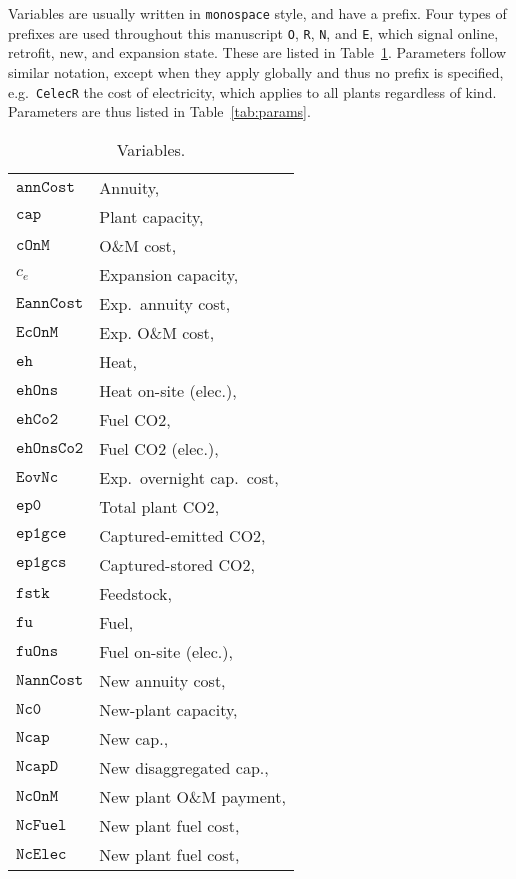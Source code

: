 \documentclass{amsart}
\begin{document}
Variables are usually written in \texttt{monospace} style, and have a prefix.
Four types of prefixes are used throughout this manuscript \texttt{O},
\texttt{R}, \texttt{N}, and \texttt{E}, which signal online, retrofit, new, and
expansion state. These are listed in Table~\ref{tab:vars}. Parameters follow
similar notation, except when they apply globally and thus no prefix is
specified, e.g.\ \texttt{CelecR} the cost of electricity, which applies to all
plants regardless of kind. Parameters are thus listed in Table~\ref{tab:params}. 
%
\begin{longtable}[c]{@{}ll@{}}
 \caption{Variables.\label{tab:vars}}\\
    $\mathtt{annCost}$	& Annuity, \\
    $\mathtt{cap}$	& Plant capacity, \\
    $\mathtt{cOnM}$	& O\&M cost, \\
    $c_e$	& Expansion capacity, \\
    $\mathtt{EannCost}$ & Exp.\ annuity cost, \\
    $\mathtt{EcOnM}$ & Exp. O\&M cost, \\
    $\mathtt{eh}$	& Heat, \\
    $\mathtt{ehOns}$	& Heat on-site (elec.), \\
    $\mathtt{ehCo2}$	& Fuel CO2, \\
    $\mathtt{ehOnsCo2}$	& Fuel CO2 (elec.), \\
    $\mathtt{EovNc}$ & Exp.\ overnight cap.\ cost, \\
    $\mathtt{ep0}$	& Total plant CO2, \\
    $\mathtt{ep1gce}$	& Captured-emitted CO2, \\
    $\mathtt{ep1gcs}$	& Captured-stored CO2, \\
    $\mathtt{fstk}$	& Feedstock, \\
    $\mathtt{fu}$	& Fuel, \\
    $\mathtt{fuOns}$	& Fuel on-site (elec.), \\
    $\mathtt{NannCost}$ & New annuity cost, \\
    $\mathtt{Nc0}$	& New-plant capacity, \\
    $\mathtt{Ncap}$ & New cap., \\
    $\mathtt{NcapD}$ & New disaggregated cap., \\
    $\mathtt{NcOnM}$ & New plant O\&M payment, \\
    $\mathtt{NcFuel}$ & New plant fuel cost, \\
    $\mathtt{NcElec}$ & New plant fuel cost, \\

\end{longtable}
\end{document}
